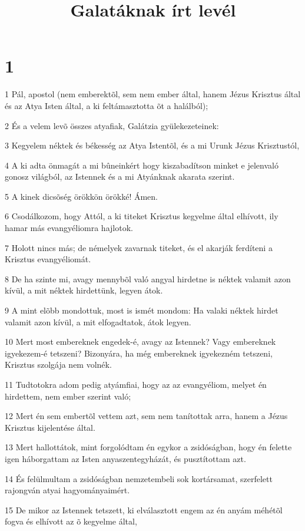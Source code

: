 

\title{Galatáknak írt levél}


\chapter{1}

\par 1 Pál, apostol (nem emberektõl, sem nem ember által, hanem Jézus Krisztus által és az Atya Isten által, a ki feltámasztotta õt a halálból);
\par 2 És a velem levõ összes atyafiak, Galátzia gyülekezeteinek:
\par 3 Kegyelem néktek és békesség az Atya Istentõl, és a mi Urunk Jézus Krisztustól,
\par 4 A ki adta önmagát a mi bûneinkért hogy kiszabadítson minket  e jelenvaló gonosz világból, az Istennek és a mi Atyánknak akarata szerint.
\par 5 A kinek dicsõség örökkön örökké! Ámen.
\par 6 Csodálkozom, hogy Attól, a ki titeket Krisztus kegyelme által elhívott, ily hamar más evangyéliomra hajlotok.
\par 7 Holott nincs más; de némelyek zavarnak titeket, és el akarják ferdíteni a Krisztus evangyéliomát.
\par 8 De ha szinte mi, avagy mennybõl való angyal hirdetne is néktek valamit azon kívül, a mit néktek hirdettünk, legyen átok.
\par 9 A mint elõbb mondottuk, most is ismét mondom: Ha valaki néktek hirdet valamit azon kívül, a mit elfogadtatok, átok legyen.
\par 10 Mert most embereknek engedek-é, avagy az Istennek? Vagy embereknek igyekezem-é tetszeni? Bizonyára, ha még embereknek igyekezném tetszeni, Krisztus szolgája nem volnék.
\par 11 Tudtotokra adom pedig atyámfiai, hogy az az evangyéliom, melyet én hirdettem, nem ember szerint való;
\par 12 Mert én sem embertõl vettem azt, sem nem tanítottak arra, hanem a Jézus Krisztus kijelentése által.
\par 13 Mert hallottátok, mint forgolódtam én egykor a zsidóságban, hogy én felette igen háborgattam az Isten anyaszentegyházát, és pusztítottam azt.
\par 14 És felülmultam a zsidóságban nemzetembeli sok kortársamat, szerfelett rajongván atyai hagyományaimért.
\par 15 De mikor az Istennek tetszett, ki elválasztott engem az én anyám méhétõl fogva és elhívott az õ kegyelme által,
